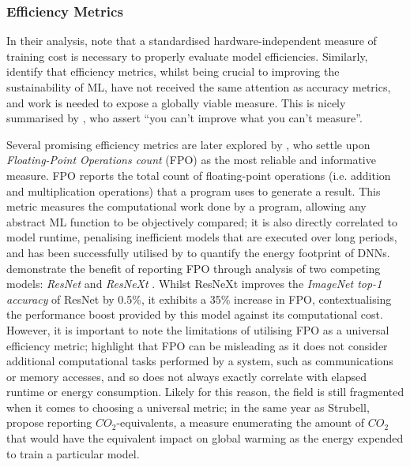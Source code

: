 \documentclass[a4paper, 12pt]{article}
\begin{document}
    \subsubsection{Efficiency Metrics}

    In their analysis,  note that a standardised hardware-independent measure of training cost is necessary to properly evaluate model efficiencies. Similarly,  identify that efficiency metrics, whilst being crucial to improving the sustainability of ML, have not received the same attention as accuracy metrics, and work is needed to expose a globally viable measure. This is nicely summarised by , who assert ``you can't improve what you can't measure”.

    Several promising efficiency metrics are later explored by , who settle upon \emph{Floating-Point Operations count} (FPO) as the most reliable and informative measure. FPO reports the total count of floating-point operations (i.e. addition and multiplication operations) that a program uses to generate a result. This metric measures the computational work done by a program, allowing any abstract ML function to be objectively compared; it is also directly correlated to model runtime, penalising inefficient models that are executed over long periods, and has been successfully utilised by  to quantify the energy footprint of DNNs.  demonstrate the benefit of reporting FPO through analysis of two competing models: \emph{ResNet} \cite{he-2015} and \emph{ResNeXt} \cite{xie-2016}. Whilst ResNeXt improves the \emph{ImageNet top-1 accuracy} of ResNet by 0.5\%, it exhibits a 35\% increase in FPO, contextualising the performance boost provided by this model against its computational cost. However, it is important to note the limitations of utilising FPO as a universal efficiency metric;  highlight that FPO can be misleading as it does not consider additional computational tasks performed by a system, such as communications or memory accesses, and so does not always exactly correlate with elapsed runtime or energy consumption. Likely for this reason, the field is still fragmented when it comes to choosing a universal metric; in the same year as Strubell,  propose reporting $CO_2$-equivalents, a measure enumerating the amount of $CO_2$ that would have the equivalent impact on global warming as the energy expended to train a particular model.
\end{document}
